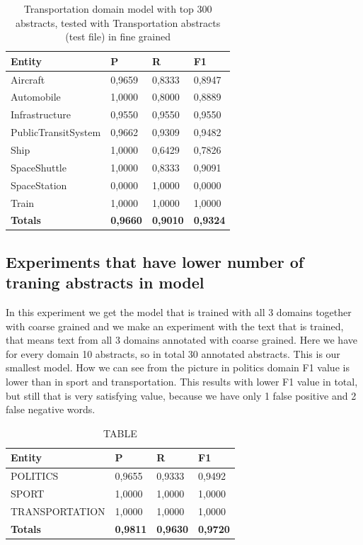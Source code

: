 \documentclass[thesis=M,english]{FITthesis}[2018/05/30]
\begin{document}
	
	\begin{table}[H]\centering
		\caption{Transportation domain model with top 300 abstracts, tested with Transportation abstracts (test file) in fine grained}
		\label{}
		\begin{tabular}{|l|l|l|l|}
			\hline {\textbf{Entity}} & {\textbf{P}} & {\textbf{R}} & {\textbf{F1}}\\\hline
				Aircraft & 0,9659 & 0,8333 & 0,8947\\
				Automobile & 1,0000 & 0,8000 & 0,8889\\				
				Infrastructure & 0,9550 & 0,9550 & 0,9550\\
				PublicTransitSystem & 0,9662 & 0,9309 & 0,9482\\
				Ship & 1,0000 & 0,6429 & 0,7826\\				
				SpaceShuttle & 1,0000 & 0,8333 & 0,9091\\
				SpaceStation & 0,0000 & 1,0000 & 0,0000\\
				Train & 1,0000 & 1,0000 & 1,0000\\\hline
				\textbf{Totals} & \textbf{0,9660} & \textbf{0,9010} & \textbf{0,9324}\\\hline
		\end{tabular}
	\end{table}	


\subsection{Experiments that have lower number of traning abstracts in model}\label{}
	In this experiment we get the model that is trained with all 3 domains together with coarse grained and we make an experiment with the text that is trained, that means text from all 3 domains annotated with coarse grained. 
	Here we have for every domain 10 abstracts, so in total 30 annotated abstracts. This is our smallest model.
	How we can see from the picture in politics domain F1 value is lower than in sport and transportation. This results with lower F1 value in total, but still that is very satisfying value, because we have only 1 false positive and 2 false negative words.  
	\begin{table}[H]\centering
		\caption{TABLE}
		\label{}
		\begin{tabular}{|l|l|l|l|}
			\hline {\textbf{Entity}} & {\textbf{P}} & {\textbf{R}} & {\textbf{F1}}\\\hline
				POLITICS & 0,9655 & 0,9333 & 0,9492\\
				SPORT & 1,0000 & 1,0000 & 1,0000\\
				TRANSPORTATION & 1,0000 & 1,0000 & 1,0000\\\hline
				\textbf{Totals} & \textbf{0,9811} & \textbf{0,9630} & \textbf{0,9720}\\\hline
		\end{tabular}
	\end{table}
\end{document}
